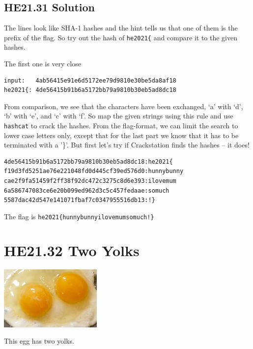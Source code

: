 \documentclass[english,a4paper,nols,noindent]{tufte-handout}
\begin{document}
\hypertarget{he21.31-solution}{%
\subsection{HE21.31 Solution}\label{he21.31-solution}}

\noindent The lines look like SHA-1 hashes and the hint tells us that one of
them is the prefix of the flag.  So try out the hash of \verb+he2021{+ and
compare it to the given hashes.

The first one is very close

\begin{verbatim} 
input:   4ab56415e91e6d5172ee79d9810e30be5da8af18
he2021{: 4de56415b91b6a5172bb79a9810b30eb5ad8dc18
\end{verbatim} 

From comparison, we see that the characters have been exchanged, `a' with `d',
`b' with `e', and `c' with `f'.  So map the given strings using this rule and
use \verb+hashcat+ to crack the hashes.  From the flag-format, we can limit the
search to lower case letters only, except that for the last part we know that
it has to be terminated with a '\}'.  But first let's try if Crackstation finds
the hashes -- it does!

\begin{verbatim} 
4de56415b91b6a5172bb79a9810b30eb5ad8dc18:he2021{
f19d3fd5251ae76e221048fd0d445cf39ed576d0:hunnybunny
cae2f9fa51459f2ff38f92dc472c3275c8d6e393:ilovemum
6a586747083ce6e20b099ed962d3c5c457fedaae:somuch
5587dac42d547e141071fbaf7c0347955516db13:!}
\end{verbatim} 

The flag is \verb+he2021{hunnybunnyilovemumsomuch!}+

\hypertarget{he21.32}{%
\section{HE21.32 Two Yolks}
  \label{he21.32}}
\begin{marginfigure}
    \includegraphics[width=50mm]{images/challenge32.jpg}
\end{marginfigure}

\noindent This egg has two yolks.
\end{document}

